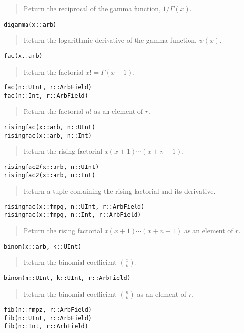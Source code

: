 \documentclass[a4paper,10pt]{article}
\newcommand{\desc}[1]{\vspace{-3mm}\begin{quote}#1\end{quote}}
\begin{document}
{{\desc{Return the reciprocal of the gamma function, $1 / \Gamma(x)$.}

\begin{lstlisting}
digamma(x::arb)
\end{lstlisting}

\desc{Return the logarithmic derivative of the gamma function, $\psi(x)$.}

\begin{lstlisting}
fac(x::arb)
\end{lstlisting}

\desc{Return the factorial $x! = \Gamma(x+1)$.}

\begin{lstlisting}
fac(n::UInt, r::ArbField)
fac(n::Int, r::ArbField)
\end{lstlisting}

\desc{Return the factorial $n!$ as an element of $r$.}

\begin{lstlisting}
risingfac(x::arb, n::UInt)
risingfac(x::arb, n::Int)
\end{lstlisting}

\desc{Return the rising factorial $x (x+1) \cdots (x+n-1)$.}

\begin{lstlisting}
risingfac2(x::arb, n::UInt)
risingfac2(x::arb, n::Int)
\end{lstlisting}

\desc{Return a tuple containing the rising factorial and its derivative.}

\begin{lstlisting}
risingfac(x::fmpq, n::UInt, r::ArbField)
risingfac(x::fmpq, n::Int, r::ArbField)
\end{lstlisting}

\desc{Return the rising factorial $x (x+1) \cdots (x+n-1)$ as an element of $r$.}

\begin{lstlisting}
binom(x::arb, k::UInt)
\end{lstlisting}

\desc{Return the binomial coefficient ${x \choose k}$.}

\begin{lstlisting}
binom(n::UInt, k::UInt, r::ArbField)
\end{lstlisting}

\desc{Return the binomial coefficient ${n \choose k}$ as an element of $r$.}

\begin{lstlisting}
fib(n::fmpz, r::ArbField)
fib(n::UInt, r::ArbField)
fib(n::Int, r::ArbField)
\end{lstlisting}

}}
\end{document}
